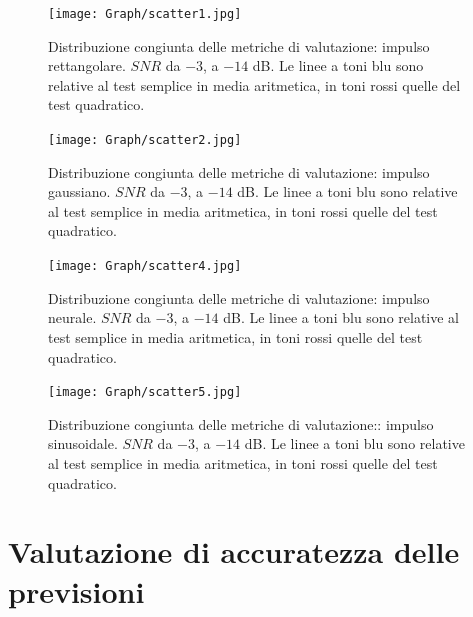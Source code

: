 \begin{figure}[htbp]
\centering
\texttt{[image: Graph/scatter1.jpg]}
\caption[Distribuzione congiunta delle metriche di valutazione al variare dell'SNR: impulso rettangolare]{Distribuzione congiunta delle metriche di valutazione: impulso rettangolare. $SNR$ da $-3$, a $-14$ dB. Le linee a toni blu sono relative al test semplice in media aritmetica, in toni rossi quelle del test quadratico.}
\label{fig:scatter1}
\end{figure}

\begin{figure}[htbp]
\centering
\texttt{[image: Graph/scatter2.jpg]}
\caption[Distribuzione congiunta delle metriche di valutazione al variare dell'SNR: impulso gaussiano ]{Distribuzione congiunta delle metriche di valutazione: impulso gaussiano. $SNR$ da $-3$, a $-14$ dB. Le linee a toni blu sono relative al test semplice in media aritmetica, in toni rossi quelle del test quadratico.}
\label{fig:scatter2}
\end{figure}

\begin{figure}[htbp]
\centering
\texttt{[image: Graph/scatter4.jpg]}
\caption[Distribuzione congiunta delle metriche di valutazione al variare dell'SNR: impulso neurale ]{Distribuzione congiunta delle metriche di valutazione: impulso neurale. $SNR$ da $-3$, a $-14$ dB. Le linee a toni blu sono relative al test semplice in media aritmetica, in toni rossi quelle del test quadratico.}
\label{fig:scatter4}
\end{figure}

\begin{figure}[htbp]
\centering
\texttt{[image: Graph/scatter5.jpg]}
\caption[Distribuzione congiunta delle metriche di valutazione al variare dell'SNR: impulso sinusoidale ]{Distribuzione congiunta delle metriche di valutazione:: impulso sinusoidale. $SNR$ da $-3$, a $-14$ dB. Le linee a toni blu sono relative al test semplice in media aritmetica, in toni rossi quelle del test quadratico.}
\label{fig:scatter5}
\end{figure}



\section{Valutazione di accuratezza delle previsioni}
\label{accuratezza}


